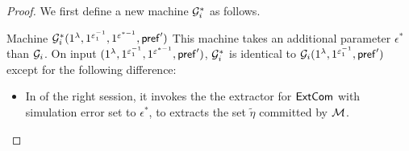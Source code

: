\begin{proof}
We first define a new machine $\mathcal{G}^*_i$ as follows.

\begin{AlgorithmBox}[label={machine:Gi*}]{Machine \textnormal{$\mathcal{G}^*_i(1^\lambda, 1^{\varepsilon_1^{-1}},  1^{\varepsilon^{*-1}}, \mathsf{pref}')$}} 
This machine takes an additional parameter $\epsilon^*$ than $\mathcal{G}_i$. On input $(1^\lambda, 1^{\varepsilon_1^{-1}},  1^{\varepsilon^{*-1}}, \mathsf{pref}')$, $\mathcal{G}^*_i$ is identical to $\mathcal{G}_i(1^\lambda, 1^{\varepsilon_1^{-1}}, \mathsf{pref}')$ except for the following difference:
\begin{itemize}
\item
In  of the right session, it invokes the the extractor for $\mathsf{ExtCom}$ with simulation error set to $\epsilon^*$, to extracts the set $\tilde{\eta}$ committed by $\mathcal{M}$.


\end{itemize}
\end{AlgorithmBox}
\end{proof}
